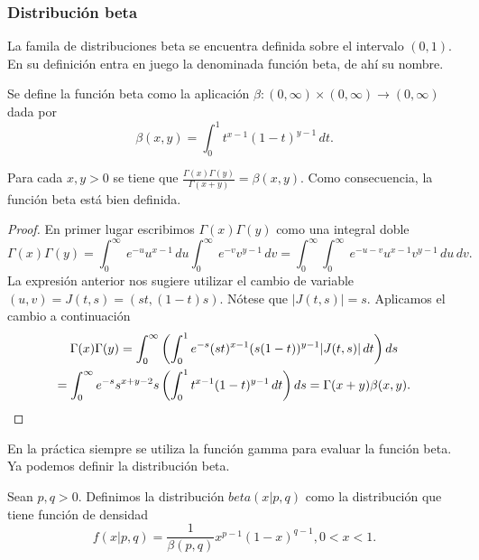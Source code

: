 \documentclass{article}
\begin{document}
\subsubsection{Distribución beta}

La famila de distribuciones beta se encuentra definida sobre el intervalo $(0, 1)$. En su definición entra en juego la denominada función beta, de ahí su nombre.

\begin{definition}
    Se define la función beta como la aplicación $\beta : (0, \infty) \times (0, \infty) \to (0, \infty)$ dada por
    \[\beta(x, y) = \int_0^1 t^{x-1}(1-t)^{y-1}\,dt.\]
\end{definition}
\begin{prop} \label{prop:beta-gamma}
    Para cada $x, y > 0$ se tiene que $\frac{\Gamma(x)\Gamma(y)}{\Gamma(x+y)} = \beta(x,y)$. Como consecuencia, la función beta está bien definida.
\end{prop}
\begin{proof}
    En primer lugar escribimos $\Gamma(x)\Gamma(y)$ como una integral doble
    \begin{equation*}
        \Gamma(x)\Gamma(y) =\int_{0}^{\infty }\ e^{-u}u^{x-1}\,d u\int_{0}^{\infty }\ e^{-v}v^{y-1}\,d v
        =\int_{0}^{\infty }\int_{0}^{\infty }\ e^{-u-v}u^{x-1}v^{y-1}\,d u\,d v.
    \end{equation*}
    La expresión anterior nos sugiere utilizar el cambio de variable $(u, v) = J(t,s) = (st, (1-t)s)$. Nótese que $|J(t,s)| = s$. Aplicamos el cambio a continuación
    \begin{gather*}
        \Gamma(x)\Gamma(y) = \int_{0}^{\infty} \left( \int_{0}^{1}e^{-s}(st)^{x-1}(s(1-t))^{y-1}|J(t,s)|\, d t \right) ds \\
        = \int_{0}^{\infty }e^{-s}s^{x+y-2}s \left(\int_{0}^{1}t^{x-1}(1-t)^{y-1}\,dt \right) d s =\Gamma(x+y)\beta(x,y).  \qedhere
    \end{gather*}
\end{proof}

En la práctica siempre se utiliza la función gamma para evaluar la función beta. Ya podemos definir la distribución beta.

\begin{definition}
    Sean $p, q > 0$. Definimos la distribución $beta(x | p, q)$ como la distribución que tiene función de densidad
    \[f(x | p, q) = \frac{1}{\beta(p,q)}x^{p-1}(1-x)^{q-1}, 0 < x < 1.\]
\end{definition}
\end{document}
